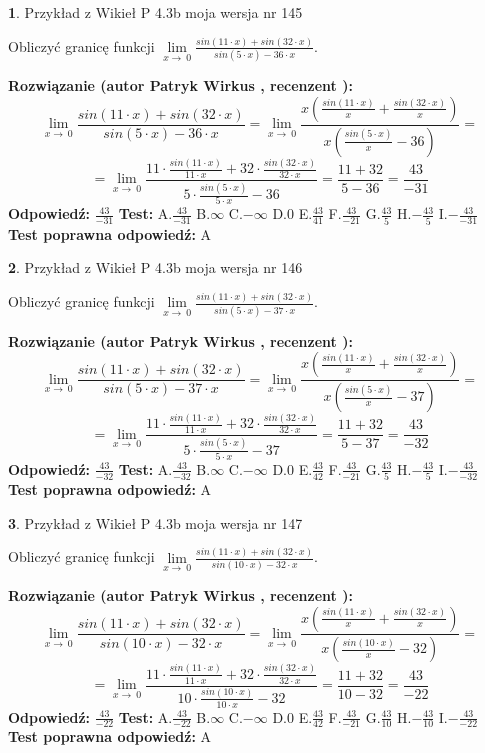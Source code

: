 \documentclass[12pt, a4paper]{article}
\theoremstyle{definition} %
\newtheorem{zad}{}
\newcommand{\zadStart}[1]{\begin{zad}#1\newline}
\newcommand{\zadStop}{\end{zad}}
\newcommand{\rozwStart}[2]{\noindent \textbf{Rozwiązanie (autor #1 , recenzent #2): }\newline}
\newcommand{\rozwStop}{\newline}
\newcommand{\odpStart}{\noindent \textbf{Odpowiedź:}\newline}
\newcommand{\odpStop}{\newline}
\newcommand{\testStart}{\noindent \textbf{Test:}\newline}
\newcommand{\testStop}{\newline}
\newcommand{\kluczStart}{\noindent \textbf{Test poprawna odpowiedź:}\newline}
\newcommand{\kluczStop}{\newline}
\begin{document}
\zadStart{Przykład z Wikieł P 4.3b moja wersja nr 145}


Obliczyć granicę funkcji $\lim\limits_{x\to\ 0}\frac{sin(11 \cdot x)+sin(32 \cdot x)}{sin(5 \cdot x)-36 \cdot x}$.
\zadStop
\rozwStart{Patryk Wirkus}{}
$$\lim\limits_{x\to\ 0}\frac{sin(11 \cdot x)+sin(32 \cdot x)}{sin(5 \cdot x)-36 \cdot x}=\lim\limits_{x\to\ 0}\frac{x(\frac{sin(11 \cdot x)}{x}+\frac{sin(32 \cdot x)}{x})}{x(\frac{sin(5 \cdot x)}{x}-36)}=$$
$$=\lim\limits_{x\to\ 0}\frac{11 \cdot \frac{sin(11 \cdot x)}{11 \cdot x}+32 \cdot \frac{sin(32 \cdot x)}{32 \cdot x}}{5 \cdot \frac{sin(5 \cdot x)}{5 \cdot x}-36}=\frac{11+32}{5-36} = \frac{43}{-31}$$
\rozwStop
\odpStart
$\frac{43}{-31}$
\odpStop
\testStart
A.$\frac{43}{-31}$
B.$\infty$
C.$-\infty$
D.$0$
E.$\frac{43}{41}$
F.$\frac{43}{-21}$
G.$\frac{43}{5}$
H.$-\frac{43}{5}$
I.$-\frac{43}{-31}$
\testStop
\kluczStart
A
\kluczStop



\zadStart{Przykład z Wikieł P 4.3b moja wersja nr 146}


Obliczyć granicę funkcji $\lim\limits_{x\to\ 0}\frac{sin(11 \cdot x)+sin(32 \cdot x)}{sin(5 \cdot x)-37 \cdot x}$.
\zadStop
\rozwStart{Patryk Wirkus}{}
$$\lim\limits_{x\to\ 0}\frac{sin(11 \cdot x)+sin(32 \cdot x)}{sin(5 \cdot x)-37 \cdot x}=\lim\limits_{x\to\ 0}\frac{x(\frac{sin(11 \cdot x)}{x}+\frac{sin(32 \cdot x)}{x})}{x(\frac{sin(5 \cdot x)}{x}-37)}=$$
$$=\lim\limits_{x\to\ 0}\frac{11 \cdot \frac{sin(11 \cdot x)}{11 \cdot x}+32 \cdot \frac{sin(32 \cdot x)}{32 \cdot x}}{5 \cdot \frac{sin(5 \cdot x)}{5 \cdot x}-37}=\frac{11+32}{5-37} = \frac{43}{-32}$$
\rozwStop
\odpStart
$\frac{43}{-32}$
\odpStop
\testStart
A.$\frac{43}{-32}$
B.$\infty$
C.$-\infty$
D.$0$
E.$\frac{43}{42}$
F.$\frac{43}{-21}$
G.$\frac{43}{5}$
H.$-\frac{43}{5}$
I.$-\frac{43}{-32}$
\testStop
\kluczStart
A
\kluczStop



\zadStart{Przykład z Wikieł P 4.3b moja wersja nr 147}


Obliczyć granicę funkcji $\lim\limits_{x\to\ 0}\frac{sin(11 \cdot x)+sin(32 \cdot x)}{sin(10 \cdot x)-32 \cdot x}$.
\zadStop
\rozwStart{Patryk Wirkus}{}
$$\lim\limits_{x\to\ 0}\frac{sin(11 \cdot x)+sin(32 \cdot x)}{sin(10 \cdot x)-32 \cdot x}=\lim\limits_{x\to\ 0}\frac{x(\frac{sin(11 \cdot x)}{x}+\frac{sin(32 \cdot x)}{x})}{x(\frac{sin(10 \cdot x)}{x}-32)}=$$
$$=\lim\limits_{x\to\ 0}\frac{11 \cdot \frac{sin(11 \cdot x)}{11 \cdot x}+32 \cdot \frac{sin(32 \cdot x)}{32 \cdot x}}{10 \cdot \frac{sin(10 \cdot x)}{10 \cdot x}-32}=\frac{11+32}{10-32} = \frac{43}{-22}$$
\rozwStop
\odpStart
$\frac{43}{-22}$
\odpStop
\testStart
A.$\frac{43}{-22}$
B.$\infty$
C.$-\infty$
D.$0$
E.$\frac{43}{42}$
F.$\frac{43}{-21}$
G.$\frac{43}{10}$
H.$-\frac{43}{10}$
I.$-\frac{43}{-22}$
\testStop
\kluczStart
A
\kluczStop
\end{document}
